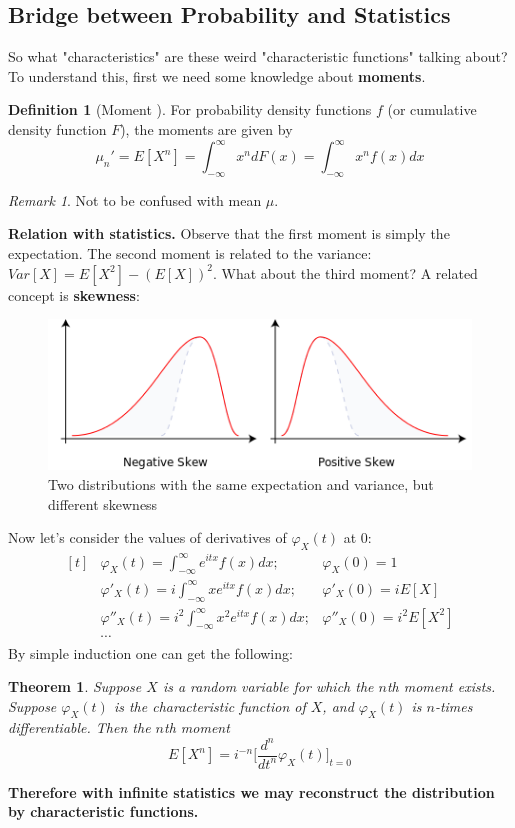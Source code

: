 \documentclass{article}
\theoremstyle{definition}
\newtheorem{definition}{Definition}[section]
\theoremstyle{plain}
\newtheorem{theorem}{Theorem}[section]
\theoremstyle{remark}
\newtheorem*{remark}{Remark}
\begin{document}
\subsection{Bridge between Probability and Statistics}
So what "characteristics" are these weird "characteristic functions" talking about? To understand this, first we need some knowledge about \textbf{moments}.
\begin{definition}[Moment \cite{wiki:moment}]
For probability density functions $f$ (or cumulative density function $F$), the moments are given by
$$\mu_n' = E[X^n] = \int_{-\infty}^\infty x^ndF(x) = \int_{-\infty}^\infty x^nf(x)dx $$
\end{definition}
\begin{remark}
Not to be confused with mean $\mu$. 
\end{remark}
\noindent\textbf{Relation with statistics.} Observe that the first moment is simply the expectation. The second moment is related to the variance: $Var[X]=E[X^2]-(E[X])^2$. What about the third moment? A related concept is \textbf{skewness}\cite{wiki:skewness}:
\begin{figure}[H]
	\centering
	\includegraphics[width=0.8\linewidth]{img/Negative_and_positive_skew_diagrams_(English)}
	\caption{Two distributions with the same expectation and variance, but different skewness} 
	\label{fig:skewness}
\end{figure}
\noindent Now let's consider the values of derivatives of $\varphi_X(t)$ at 0:
$$
\begin{aligned}[t]
&\varphi_X(t)=\int_{-\infty}^\infty e^{itx}f(x)dx; & \varphi_X(0)=1\\
&\varphi'_X(t)=i\int_{-\infty}^\infty xe^{itx}f(x)dx; & \varphi'_X(0)=iE[X]\\
&\varphi''_X(t)=i^2\int_{-\infty}^\infty x^2e^{itx}f(x)dx; & \varphi''_X(0)=i^2E[X^2]\\
&\cdots
\end{aligned}
$$
\noindent By simple induction one can get the following:
\begin{theorem}
	Suppose $X$ is a random variable for which the $n$th moment exists. Suppose $\varphi_X(t)$ is the characteristic function of $X$, and $\varphi_X(t)$ is $n$-times differentiable. Then the $n$th moment $$E[X^n]=i^{-n}\biggl[\frac{d^n}{dt^n}\varphi_X(t)\biggr]_{t=0}$$
\end{theorem}
\noindent\textbf{Therefore with infinite statistics we may reconstruct the distribution by characteristic functions.}\\
\end{document}
